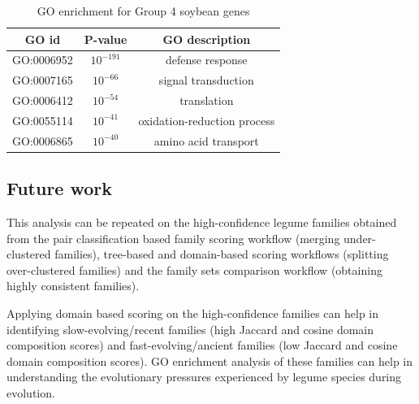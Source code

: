 \documentclass{article}
\begin{document}
		\begin{table}[h!]
			\centering
			\begin{tabular}{|c |c |c |} 
				\hline
				GO id & P-value & GO description \\
				\hline\hline
				GO:0006952 & $10^{-191}$ & defense response \\ 
				\hline
				GO:0007165 & $10^{-66}$ & signal transduction \\
				\hline
				GO:0006412 & $10^{-54}$ & translation \\
				\hline
				GO:0055114 & $10^{-41}$ & oxidation-reduction process \\
				\hline
				GO:0006865 & $10^{-40}$ & amino acid transport \\ 
				\hline
			\end{tabular}
			\caption{GO enrichment for Group 4 soybean genes}
			\label{tab:gotable_group4}
		\end{table}
		
		
		
		\subsection{Future work}
		This analysis can be repeated on the high-confidence legume families obtained from the pair classification based family scoring workflow (merging under-clustered families), tree-based and domain-based scoring workflows (splitting over-clustered families) and the family sets comparison workflow (obtaining highly consistent families). 
		
		Applying domain based scoring on the high-confidence families can help in identifying slow-evolving/recent families (high Jaccard and cosine domain composition scores) and fast-evolving/ancient families (low Jaccard and cosine domain composition scores). GO enrichment analysis of these families can help in understanding the evolutionary pressures experienced by legume species during evolution.
		
		
	
	
	
	
	
\end{document}
